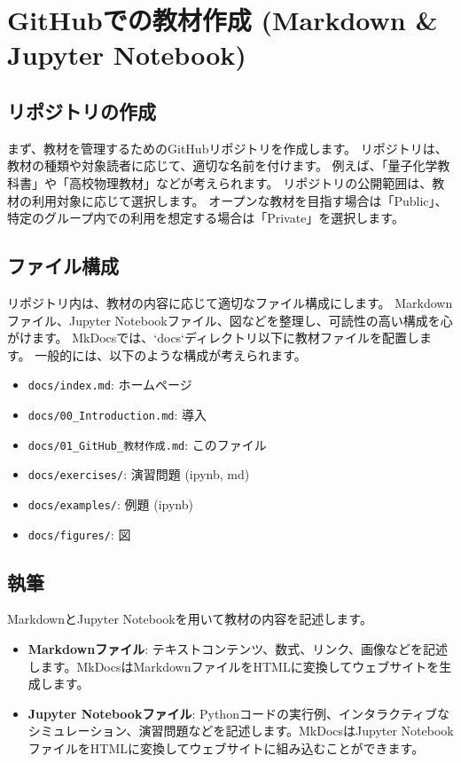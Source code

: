 \section{GitHubでの教材作成 (Markdown \& Jupyter Notebook)}

\subsection{リポジトリの作成}
まず、教材を管理するためのGitHubリポジトリを作成します。
リポジトリは、教材の種類や対象読者に応じて、適切な名前を付けます。
例えば、「量子化学教科書」や「高校物理教材」などが考えられます。
リポジトリの公開範囲は、教材の利用対象に応じて選択します。
オープンな教材を目指す場合は「Public」、特定のグループ内での利用を想定する場合は「Private」を選択します。

\subsection{ファイル構成}
リポジトリ内は、教材の内容に応じて適切なファイル構成にします。
Markdownファイル、Jupyter Notebookファイル、図などを整理し、可読性の高い構成を心がけます。
MkDocsでは、`docs`ディレクトリ以下に教材ファイルを配置します。
一般的には、以下のような構成が考えられます。

\begin{itemize}
    \item \texttt{docs/index.md}:  ホームページ
    \item \texttt{docs/00\_Introduction.md}:  導入
    \item \texttt{docs/01\_GitHub\_教材作成.md}:  このファイル
    \item \texttt{docs/exercises/}:  演習問題 (ipynb, md)
    \item \texttt{docs/examples/}:  例題 (ipynb)
    \item \texttt{docs/figures/}:  図
\end{itemize}

\subsection{執筆}
MarkdownとJupyter Notebookを用いて教材の内容を記述します。

\begin{itemize}
    \item \textbf{Markdownファイル}:  テキストコンテンツ、数式、リンク、画像などを記述します。MkDocsはMarkdownファイルをHTMLに変換してウェブサイトを生成します。
    \item \textbf{Jupyter Notebookファイル}:  Pythonコードの実行例、インタラクティブなシミュレーション、演習問題などを記述します。MkDocsはJupyter NotebookファイルをHTMLに変換してウェブサイトに組み込むことができます。
\end{itemize}

